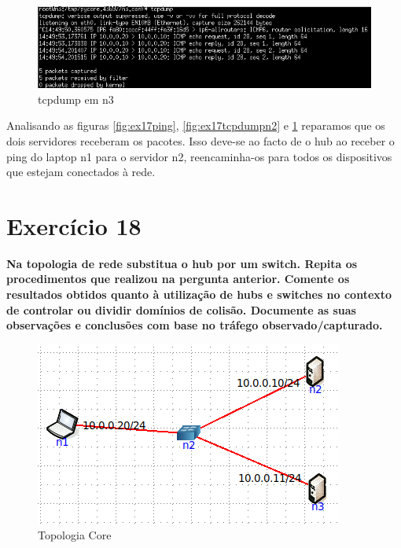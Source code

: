 \documentclass[a4paper]{report}
\begin{document}
\begin{figure}[H]
    \centering 
    \includegraphics[width=\textwidth]{images/ex17tcpdumpn3.png}
    \caption{tcpdump em n3}
    \label{fig:ex17tcpdumpn3}
\end{figure}

Analisando as figuras \ref{fig:ex17ping}, \ref{fig:ex17tcpdumpn2} e 
\ref{fig:ex17tcpdumpn3} reparamos que os dois servidores receberam os pacotes.
Isso deve-se ao facto de o hub ao receber o ping do laptop n1 para o servidor n2, 
reencaminha-os para todos os dispositivos que estejam conectados à rede.

\section{Exercício 18}
\textbf{Na topologia de rede substitua o hub por um switch. Repita os
procedimentos que realizou na pergunta anterior. Comente os resultados obtidos
quanto à utilização de hubs e switches no contexto de controlar ou dividir
domínios de colisão. Documente as suas observações e conclusões com base no
tráfego observado/capturado.}

\begin{figure}[H]
    \centering 
    \includegraphics[width=\textwidth]{images/ex18topologiacore.png}
    \caption{Topologia Core}
    \label{fig:ex18topologiacore}
\end{figure}
\end{document}
